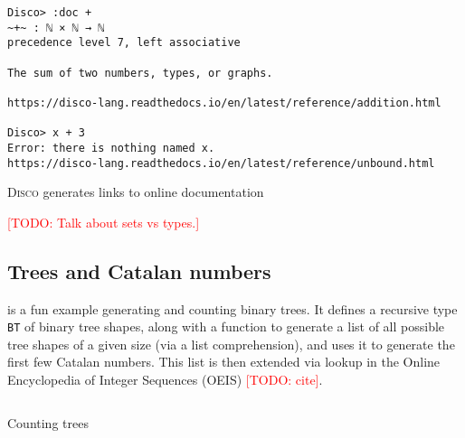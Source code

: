 \documentclass[submission,copyright,creativecommons]{eptcs}
\newcommand{\disco}{\textsc{Disco}\xspace}
\newcommand{\pref}[1]{\prettyref{#1}}
\newcommand{\todo}[1]{\textcolor{red}{[TODO: #1]}}
\newcommand{\todo}[1]{}
\begin{document}
\begin{listing}[!htp]
\begin{verbatim}
Disco> :doc +
~+~ : ℕ × ℕ → ℕ
precedence level 7, left associative

The sum of two numbers, types, or graphs.

https://disco-lang.readthedocs.io/en/latest/reference/addition.html

Disco> x + 3
Error: there is nothing named x.
https://disco-lang.readthedocs.io/en/latest/reference/unbound.html
\end{verbatim}
\caption{\disco generates links to online documentation}
\label{lst:doc}
\end{listing}

\todo{Talk about sets vs types.}

\subsection{Trees and Catalan numbers}

\pref{lst:catalan} is a fun example generating and counting binary
trees. It defines a recursive type \texttt{BT} of binary tree shapes,
along with a function to generate a list of all possible tree shapes
of a given size (via a list comprehension), and uses it to generate
the first few Catalan numbers.  This list is then extended via lookup
in the Online Encyclopedia of Integer Sequences (OEIS) \todo{cite}.

\begin{listing}
  \inputminted{text}{examples/catalan.disco}
  \caption{Counting trees}
  \label{lst:catalan}
\end{listing}
\end{document}
